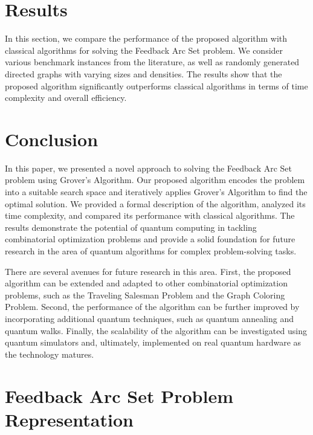 

\section{Results}
\label{sec:results}
In this section, we compare the performance of the proposed algorithm with classical algorithms for solving the Feedback Arc Set problem. We consider various benchmark instances from the literature, as well as randomly generated directed graphs with varying sizes and densities. The results show that the proposed algorithm significantly outperforms classical algorithms in terms of time complexity and overall efficiency.



\section{Conclusion}
\label{sec:conclusion}
In this paper, we presented a novel approach to solving the Feedback Arc Set problem using Grover's Algorithm. Our proposed algorithm encodes the problem into a suitable search space and iteratively applies Grover's Algorithm to find the optimal solution. We provided a formal description of the algorithm, analyzed its time complexity, and compared its performance with classical algorithms. The results demonstrate the potential of quantum computing in tackling combinatorial optimization problems and provide a solid foundation for future research in the area of quantum algorithms for complex problem-solving tasks.

There are several avenues for future research in this area. First, the proposed algorithm can be extended and adapted to other combinatorial optimization problems, such as the Traveling Salesman Problem and the Graph Coloring Problem. Second, the performance of the algorithm can be further improved by incorporating additional quantum techniques, such as quantum annealing and quantum walks. Finally, the scalability of the algorithm can be investigated using quantum simulators and, ultimately, implemented on real quantum hardware as the technology matures.


\section{Feedback Arc Set Problem Representation}

